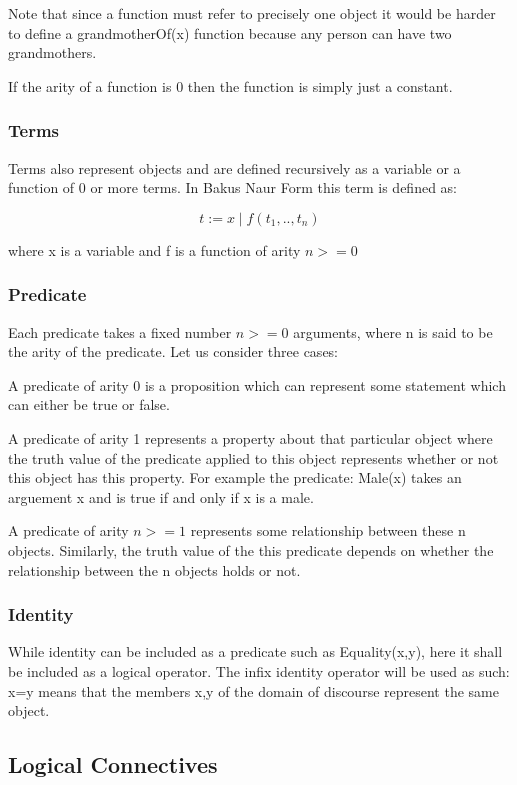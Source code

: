Note that since a function must refer to precisely one object it would be harder to define a grandmotherOf(x) function because any person can have two grandmothers.

If the arity of a function is 0 then the function is simply just a constant.


\subsubsection*{Terms}

Terms also represent objects and are defined recursively as a variable or a function of 0 or more terms. In Bakus Naur Form this term is defined as:

$$ t:= x \mid f(t_1,..,t_n)$$

where x is a variable and f is a function of arity $n>=0$

\subsubsection*{Predicate}

Each predicate takes a fixed number $n>=0$ arguments, where n is said to be the arity of the predicate. Let us consider three cases:

A predicate of arity 0 is a proposition which can represent some statement which can either be true or false.

A predicate of arity 1 represents a property about that particular object where the truth value of the predicate applied to this object represents whether or not this object has this property. For example the predicate: Male(x) takes an arguement x and is true if and only if x is a male.

A predicate of arity $n >=1$ represents some relationship between these n objects. Similarly, the truth value of the this predicate depends on whether the relationship between the n objects holds or not.

\subsubsection*{Identity}

While identity can be included as a predicate such as Equality(x,y), here it shall be included as a logical operator. The infix identity operator will be used as such: x=y means that the members x,y of the domain of discourse represent the same object. 

\subsection*{Logical Connectives}

